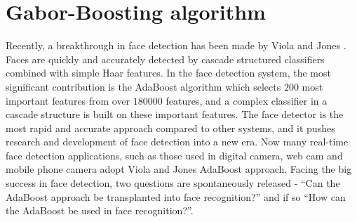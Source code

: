 \section{Gabor-Boosting algorithm}
Recently, a breakthrough in face detection has been made by Viola and Jones \cite{Viola2001}. Faces are quickly and accurately detected by cascade structured classifiers combined with simple Haar features. In the face detection system, the most significant contribution is the AdaBoost algorithm which selects $200$ most important features from over $180000$ features, and a complex classifier in a cascade structure is built on these important features. The face detector is the most rapid and accurate approach compared to other systems, and it pushes research and development of face detection into a new era. Now many real-time face detection applications, such as those used in digital camera, web cam and mobile phone camera adopt Viola and Jones AdaBoost approach. Facing the big success in face detection, two questions are spontaneously released - ``Can the AdaBoost approach be transplanted into face recognition?'' and if so ``How can the AdaBoost be used in face recognition?''. 

